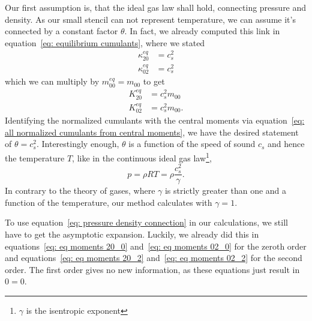 Our first assumption is, that the ideal gas law shall hold, connecting pressure and density.
As our small stencil can not represent temperature, we can assume it's connected by a constant factor $\theta$.
In fact, we already computed this link in equation~\eqref{eq: equilibrium cumulants}, where we stated
\begin{equation}
  \begin{aligned}
    \kappa_{20}^{eq} & = c_s^2  \\
    \kappa_{02}^{eq} & = c_s^2
  \end{aligned}
\end{equation}
which we can multiply by $m_{00}^{eq} = m_{00}$ to get
\begin{equation}
\label{eq: pressure density connection}
  \begin{aligned}
    K_{20}^{eq} & = c_s^2 m_{00}  \\
    K_{02}^{eq} & = c_s^2 m_{00}.
  \end{aligned}
\end{equation}
Identifying the normalized cumulants with the central moments via equation~\eqref{eq: all normalized cumulants from central moments}, we have the desired statement of $\theta=c_s^2$.
Interestingly enough, $\theta$ is a function of the speed of sound $c_s$ and hence the temperature $T$, like in the continuous ideal gas law\footnote{$\gamma$ is the isentropic exponent },
\begin{equation}
  p=\rho RT = \rho \frac{c_s^2}{\gamma}.
\end{equation}
In contrary to the theory of gases, where $\gamma$ is strictly greater than one and a function of the temperature, our method calculates with $\gamma=1$.


To use equation~\eqref{eq: pressure density connection} in our calculations, we still have to get the asymptotic expansion.
Luckily, we already did this in equations~\eqref{eq: eq moments 20_0} and~\eqref{eq: eq moments 02_0} for the zeroth order and equations~\eqref{eq: eq moments 20_2} and~\eqref{eq: eq moments 02_2} for the second order.
The first order gives no new information, as these equations just result in $0=0$.
